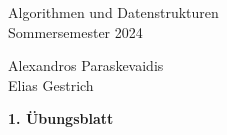\documentclass[11pt]{scrartcl}
\newcommand{\sheetNum}{1} %
\newcommand{\studentOne}{Alexandros Paraskevaidis} %
\newcommand{\studentTwo}{Elias Gestrich} %
\begin{document}
\begin{small}
\begin{minipage}{0.5 \linewidth}
  Algorithmen und Datenstrukturen\\
  Sommersemester 2024
\end{minipage}
\begin{minipage}{0.5\linewidth}
  \begin{flushright}
    \studentOne\\
    \studentTwo
  \end{flushright}
\end{minipage}
\end{small}
\begin{center}
\begin{sffamily}\Large\bfseries \sheetNum. Übungsblatt\end{sffamily}
\end{center}
\end{document}
